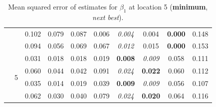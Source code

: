\documentclass[authoryear, review, 11pt]{elsarticle}
\begin{document}
\begin{table}[ht]
\begin{center}
{\begin{tabular}{cccccccccc}
  &  & 0.102 & 0.079 & 0.087 & 0.006 & \emph{0.004} & 0.004 & \textbf{0.000} & 0.148 \\ 
  &  & 0.094 & 0.056 & 0.069 & 0.067 & \emph{0.012} & 0.015 & \textbf{0.000} & 0.153 \\ 
  \cline{3-10}
  & \multirow{4}{*}{5} & 0.031 & 0.018 & 0.018 & 0.019 & \textbf{0.008} & \emph{0.009} & 0.058 & 0.111 \\ 
  &  & 0.060 & 0.044 & 0.042 & 0.091 & \emph{0.024} & \textbf{0.022} & 0.060 & 0.112 \\ 
  &  & 0.035 & 0.014 & 0.019 & 0.039 & \textbf{0.009} & \emph{0.009} & 0.056 & 0.107 \\ 
  &  & 0.062 & 0.030 & 0.040 & 0.079 & \emph{0.024} & \textbf{0.020} & 0.064 & 0.116 \\ 
  \end{tabular}}
\caption{Mean squared error of estimates for $\beta_1$ at location 5 (\textbf{minimum}, \emph{next best}).\label{MSEX}}
\end{center}
\end{table}	
 
\end{document}
